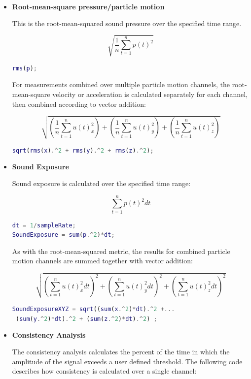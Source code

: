 \documentclass[11pt]{report}
\begin{document}
\begin{itemize}
\item \textbf{Root-mean-square pressure/particle motion}

This is the root-mean-squared sound pressure over the specified time range.

$$ \sqrt{\frac{1}{n} \sum_{t  =1}^{n}p(t)^2} $$

\begin{lstlisting}[style=github, language=MATLAB]
rms(p);
\end{lstlisting}

For measurements combined over multiple particle motion channels, the root-mean-square velocity or acceleration is calculated separately for each channel, then combined according to vector addition:

$$\sqrt{\left(\frac{1}{n} \sum_{t = 1}^{n}u(t)^2_x \right) + \left(\frac{1}{n} \sum_{t = 1}^{n}u(t)_y^2 \right) + \left(\frac{1}{n} \sum_{t = 1}^{n}u(t)^2_z \right)}$$

\begin{lstlisting}[style=github, language=MATLAB]
sqrt(rms(x).^2 + rms(y).^2 + rms(z).^2);
\end{lstlisting}

\item \textbf{Sound Exposure}

Sound exposure is calculated over the specified time range:

$$ \sum_{t = 1}^{n}p(t)^2 dt $$

\begin{lstlisting}[style=github, language=MATLAB]
dt = 1/sampleRate;
SoundExposure = sum(p.^2)*dt;
\end{lstlisting}

As with the root-mean-squared metric, the results for combined particle motion channels are summed together with vector addition:

$$ \sqrt{\left(\sum_{t = 1}^{n}u(t)_x^2 dt \right)^2 + \left(\sum_{t = 1}^{n}u(t)^2_y dt \right)^2 + \left( \sum_{t = 1}^{n}u(t)^2_z dt \right)^2 }$$

\begin{lstlisting}[style=github, language=MATLAB]
SoundExposureXYZ = sqrt((sum(x.^2)*dt).^2 +...
 (sum(y.^2)*dt).^2 + (sum(z.^2)*dt).^2) ;
\end{lstlisting}

\item \textbf{Consistency Analysis}

The consistency analysis calculates the percent of the time in which the amplitude of the signal exceeds a user defined threshold.  The following code describes how consistency is calculated over a single channel:


\end{itemize}
\end{document}
